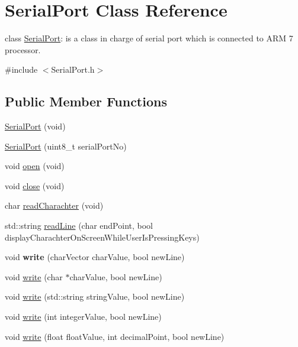 \hypertarget{class_serial_port}{
\section{SerialPort Class Reference}
\label{class_serial_port}
}


class \hyperlink{class_serial_port}{SerialPort}: is a class in charge of serial port which is connected to ARM 7 processor.  




{\ttfamily \#include $<$SerialPort.h$>$}

\subsection*{Public Member Functions}
\begin{DoxyCompactItemize}
\item 
\hyperlink{class_serial_port_ada293366f077e225baa5290634c60d88}{SerialPort} (void)
\item 
\hyperlink{group__group8_ga519a9b40483d14c104f71ca4880cc1a1}{SerialPort} (uint8\_\-t serialPortNo)
\item 
void \hyperlink{group__group8_ga6d80380bb3415a1ee4355ffcec98773c}{open} (void)
\item 
void \hyperlink{group__group8_gaabba6d6f25800b197cee28ed8e605f2a}{close} (void)
\item 
char \hyperlink{group__group8_gaec0ee477ce1fbd16ce862abd9116e2ad}{readCharachter} (void)
\item 
std::string \hyperlink{group__group8_ga46bc7a8f70d57e8f59729432b0c81d3e}{readLine} (char endPoint, bool displayCharachterOnScreenWhileUserIsPressingKeys)
\item 
\hypertarget{group__group8_gafed1850129619b1d56beb8ea008599de}{
void {\bfseries write} (charVector charValue, bool newLine)}
\label{group__group8_gafed1850129619b1d56beb8ea008599de}

\item 
void \hyperlink{group__group8_gae48d12719fd7e1e2b0e35f127a5006bf}{write} (char $\ast$charValue, bool newLine)
\item 
void \hyperlink{group__group8_ga93f70c8ee96c97eee2d31df578bdf51e}{write} (std::string stringValue, bool newLine)
\item 
void \hyperlink{group__group8_gad981db5bddd0681367480c272c87fb38}{write} (int integerValue, bool newLine)
\item 
void \hyperlink{group__group8_gab50edcebab73bfe52b729f677dd61636}{write} (float floatValue, int decimalPoint, bool newLine)
\end{DoxyCompactItemize}


